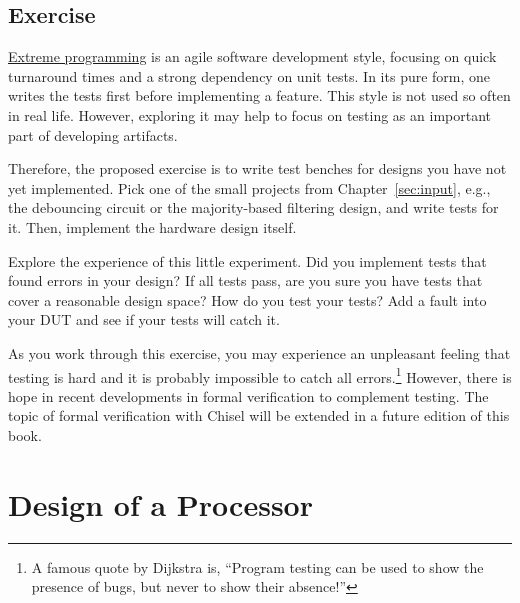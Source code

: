 \documentclass[%
    10pt,
    headinclude, footexclude,
    openright, %
    notitlepage,
    cleardoubleempty,
    headsepline,
    pointlessnumbers,
    bibtotoc, idxtotoc,
    ]{scrbook}
\newcommand{\todo}[1]{{\emph{TODO: #1}}}
\renewcommand{\todo}[1]{}
\begin{document}
\todo{What are the limitations?}





\section{Exercise}

\href{https://en.wikipedia.org/wiki/Extreme_programming}{Extreme programming} is an agile
software development style, focusing on quick turnaround times and a strong dependency on unit
tests. In its pure form, one writes the tests first before implementing a feature. This style is not used
so often in real life. However, exploring it may help to focus on testing as an important part of
developing artifacts.

Therefore, the proposed exercise is to write test benches for designs you have not yet implemented.
Pick one of the small projects from Chapter~\ref{sec:input}, e.g., the debouncing circuit or
the majority-based filtering design, and write tests for it. Then, implement the hardware design
itself.

Explore the experience of this little experiment. Did you implement tests that found errors in your design?
If all tests pass, are you sure you have tests that cover a reasonable design space? How do you test
your tests? Add a fault into your DUT and see if your tests will catch it.

As you work through this exercise, you may experience an unpleasant feeling that testing is hard and
it is probably impossible to catch all errors.\footnote{A famous quote by Dijkstra is, ``Program testing can
be used to show the presence of bugs, but never to show their absence!''}
However, there is hope in recent developments in formal verification to complement testing.
The topic of formal verification with Chisel will be extended in a future edition of this book.

\chapter{Design of a Processor}
\label{chap:leros}
\end{document}
